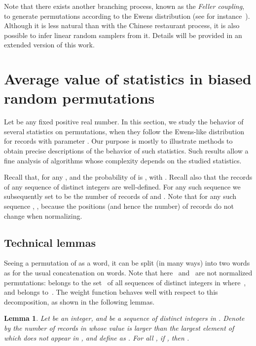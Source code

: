 \documentclass[proceedings]{aofa}
\newtheorem{lemma}[theorem]{Lemma}
\begin{document}
Note that there exists another branching process, known as the {\em Feller coupling}, to generate permutations according to the Ewens distribution (see for instance~\cite[p.16]{Arratia}). 
Although it is less natural than with the Chinese restaurant process, it is also possible to infer linear random samplers from it. 
Details will be provided in an extended version of this work. 

\section{Average value of statistics in biased random permutations}\label{sec:stats}

Let  be any fixed positive real number. 
In this section, we study the behavior of several statistics on permutations, 
when they follow the Ewens-like distribution for records with parameter . 
Our purpose is mostly to illustrate methods to obtain precise descriptions of the behavior of such statistics. 
Such results allow a fine analysis of algorithms whose complexity depends on the studied statistics.

Recall that, for any ,  
and the probability of  is , with . 
Recall also that the records of any sequence of distinct integers are well-defined.  
For any such sequence  we subsequently set 
 to be the number of records of  and . 
Note that for any such sequence , , 
because the positions (and hence the number) of records do not change when normalizing. 

\subsection{Technical lemmas}

Seeing a permutation of  as a word, it can be split (in many ways) 
into two words as  for the usual concatenation on words. 
Note that here~ and~ are not normalized permutations:   belongs to the set~ of all sequences of  distinct integers in  where~, and  belongs to~.
The weight function  behaves well with respect to this decomposition, as shown in the following lemmas. 

\begin{lemma}\label{lem:weight prime}
Let  be an integer, and  be a sequence of  distinct integers in . 
Denote by  the number of records in  whose value is larger than the largest element of  which does not appear in ,
and define  as . 
For all , if , then .
\end{lemma}
\end{document}
